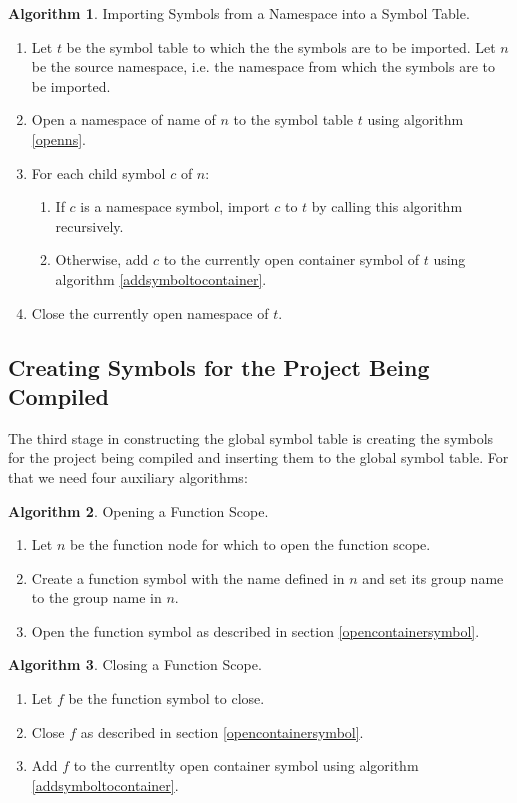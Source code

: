 \documentclass[a4paper,oneside,11pt]{book}
\theoremstyle{definition}
\newtheorem{algo}{Algorithm}[section]
\begin{document}
\begin{algo}\label{importns} Importing Symbols from a Namespace into a Symbol Table.
\begin{enumerate}
\item
Let $t$ be the symbol table to which the the symbols are to be imported.
Let $n$ be the source namespace, i.e. the namespace from which the symbols are to be imported.
\item
Open a namespace of name of $n$ to the symbol table $t$ using algorithm \ref{openns}.
\item
For each child symbol $c$ of $n$:
\begin{enumerate}
\item
If $c$ is a namespace symbol, import $c$ to $t$ by calling this algorithm recursively.
\item
Otherwise, add $c$ to the currently open container symbol of $t$ using algorithm \ref{addsymboltocontainer}.
\end{enumerate}
\item
Close the currently open namespace of $t$.
\end{enumerate}
\end{algo}

\subsection{Creating Symbols for the Project Being Compiled}

The third stage in constructing the global symbol table is creating the symbols for the project being compiled
and inserting them to the global symbol table.
For that we need four auxiliary algorithms:

\begin{algo}\label{openfunctionscope} Opening a Function Scope.
\begin{enumerate}
\item
Let $n$ be the function node for which to open the function scope.
\item
Create a function symbol with the name defined in $n$ and set its group name to the group name in $n$.
\item
Open the function symbol as described in section \ref{opencontainersymbol}.
\end{enumerate}
\end{algo}

\begin{algo}\label{closefunctionscope} Closing a Function Scope.
\begin{enumerate}
\item
Let $f$ be the function symbol to close.
\item
Close $f$ as described in section \ref{opencontainersymbol}.
\item
Add $f$ to the currentlty open container symbol using algorithm \ref{addsymboltocontainer}.
\end{enumerate}
\end{algo}
\end{document}
